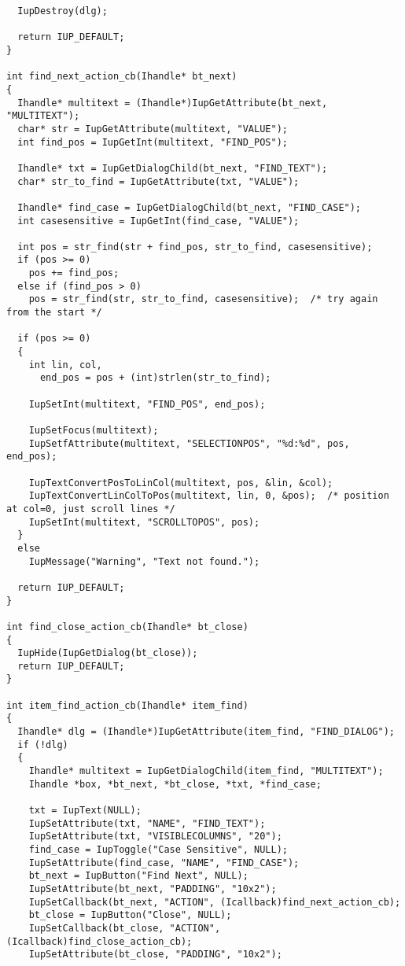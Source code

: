 \documentclass{ctexart}
\begin{document}
\begin{lstlisting}
  IupDestroy(dlg);

  return IUP_DEFAULT;
}

int find_next_action_cb(Ihandle* bt_next)
{
  Ihandle* multitext = (Ihandle*)IupGetAttribute(bt_next, "MULTITEXT");
  char* str = IupGetAttribute(multitext, "VALUE");
  int find_pos = IupGetInt(multitext, "FIND_POS");

  Ihandle* txt = IupGetDialogChild(bt_next, "FIND_TEXT");
  char* str_to_find = IupGetAttribute(txt, "VALUE");

  Ihandle* find_case = IupGetDialogChild(bt_next, "FIND_CASE");
  int casesensitive = IupGetInt(find_case, "VALUE");

  int pos = str_find(str + find_pos, str_to_find, casesensitive);
  if (pos >= 0)
    pos += find_pos;
  else if (find_pos > 0)
    pos = str_find(str, str_to_find, casesensitive);  /* try again from the start */

  if (pos >= 0)
  {
    int lin, col, 
      end_pos = pos + (int)strlen(str_to_find);

    IupSetInt(multitext, "FIND_POS", end_pos);

    IupSetFocus(multitext);
    IupSetfAttribute(multitext, "SELECTIONPOS", "%d:%d", pos, end_pos);

    IupTextConvertPosToLinCol(multitext, pos, &lin, &col);
    IupTextConvertLinColToPos(multitext, lin, 0, &pos);  /* position at col=0, just scroll lines */
    IupSetInt(multitext, "SCROLLTOPOS", pos);
  }
  else
    IupMessage("Warning", "Text not found.");

  return IUP_DEFAULT;
}

int find_close_action_cb(Ihandle* bt_close)
{
  IupHide(IupGetDialog(bt_close));
  return IUP_DEFAULT;
}

int item_find_action_cb(Ihandle* item_find)
{
  Ihandle* dlg = (Ihandle*)IupGetAttribute(item_find, "FIND_DIALOG");
  if (!dlg)
  {
    Ihandle* multitext = IupGetDialogChild(item_find, "MULTITEXT");
    Ihandle *box, *bt_next, *bt_close, *txt, *find_case;

    txt = IupText(NULL);
    IupSetAttribute(txt, "NAME", "FIND_TEXT");
    IupSetAttribute(txt, "VISIBLECOLUMNS", "20");
    find_case = IupToggle("Case Sensitive", NULL);
    IupSetAttribute(find_case, "NAME", "FIND_CASE");
    bt_next = IupButton("Find Next", NULL);
    IupSetAttribute(bt_next, "PADDING", "10x2");
    IupSetCallback(bt_next, "ACTION", (Icallback)find_next_action_cb);
    bt_close = IupButton("Close", NULL);
    IupSetCallback(bt_close, "ACTION", (Icallback)find_close_action_cb);
    IupSetAttribute(bt_close, "PADDING", "10x2");


\end{lstlisting}
\end{document}
